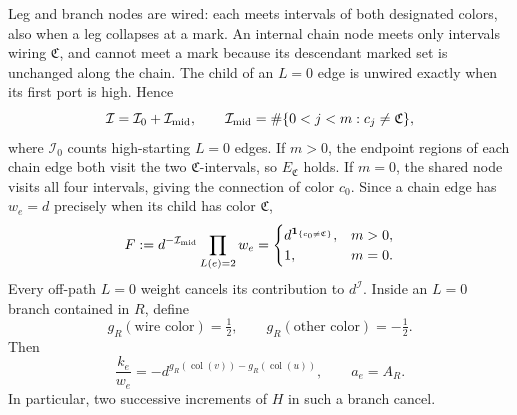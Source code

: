 Leg and branch nodes are wired: each meets intervals of both designated
colors, also when a leg collapses at a mark.  An internal chain node
meets only intervals wiring $\mathfrak C$, and cannot meet a mark because
its descendant marked set is unchanged along the chain.  The child of
an $L=0$ edge is unwired exactly when its first port is high.  Hence
\begin{equation}
 \mathcal I=\mathcal I_0+\mathcal I_{\rm mid},\qquad
 \mathcal I_{\rm mid}=\#\{0<j<m:c_j\ne\mathfrak C\},
 \label{four:count-split}
\end{equation}
where $\mathcal I_0$ counts high-starting $L=0$ edges.  If $m>0$,
the endpoint regions of each chain edge both visit the two
$\mathfrak C$-intervals, so $E_{\mathfrak C}$ holds.  If $m=0$,
the shared node visits all four intervals, giving the connection of
color $c_0$.  Since a chain edge has $w_e=d$ precisely when its child
has color $\mathfrak C$,
\begin{equation}
 F:=d^{-\mathcal I_{\rm mid}}\prod_{L(e)=2}w_e
 =\begin{cases}
 d^{\mathbf1_{\{c_0\ne\mathfrak C\}}},&m>0,\\
 1,&m=0.
 \end{cases}
 \label{four:F}
\end{equation}
Every off-path $L=0$ weight cancels its contribution to $d^{\mathcal I}$.
Inside an $L=0$ branch contained in $R$, define
\begin{equation}
 g_R(\text{wire color})=\tfrac12,\qquad
 g_R(\text{other color})=-\tfrac12.
 \label{four:g}
\end{equation}
Then
\begin{equation}
 \frac{k_e}{w_e}
 =-d^{g_R(\operatorname{col}(v))-g_R(\operatorname{col}(u))},
 \qquad a_e=A_R.
 \label{four:tail}
\end{equation}
In particular, two successive increments of $H$ in such a branch cancel.

